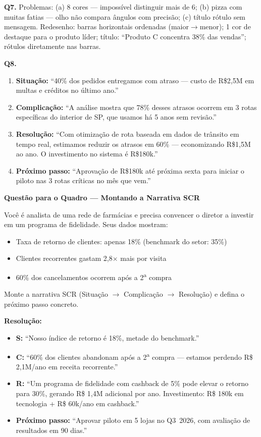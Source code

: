 \begin{SolvedBox}
\textbf{Q7.} Problemas: (a) 8 cores — impossível distinguir mais de 6; (b) pizza com muitas fatias —
olho não compara ângulos com precisão; (c) título rótulo sem mensagem. Redesenho:
barras horizontais ordenadas (maior$\to$menor); 1 cor de destaque para o produto líder;
título: ``Produto C concentra 38\% das vendas''; rótulos diretamente nas barras.

\textbf{Q8.}
\begin{enumerate}
  \item \textbf{Situação:} ``40\% dos pedidos entregamos com atraso — custo de R\$2,5M em multas e créditos no último ano.''
  \item \textbf{Complicação:} ``A análise mostra que 78\% desses atrasos ocorrem em 3 rotas específicas do interior de SP, que usamos há 5 anos sem revisão.''
  \item \textbf{Resolução:} ``Com otimização de rota baseada em dados de trânsito em tempo real, estimamos reduzir os atrasos em 60\% — economizando R\$1,5M ao ano. O investimento no sistema é R\$180k.''
  \item \textbf{Próximo passo:} ``Aprovação de R\$180k até próxima sexta para iniciar o piloto nas 3 rotas críticas no mês que vem.''
\end{enumerate}
\end{SolvedBox}

\begin{SolvedBox}
\textbf{Questão para o Quadro — Montando a Narrativa SCR}

Você é analista de uma rede de farmácias e precisa convencer o
diretor a investir em um programa de fidelidade. Seus dados mostram:
\begin{itemize}
  \item Taxa de retorno de clientes: apenas 18\% (benchmark do setor: 35\%)
  \item Clientes recorrentes gastam 2{,}8$\times$ mais por visita
  \item 60\% dos cancelamentos ocorrem após a 2\textsuperscript{a} compra
\end{itemize}

Monte a narrativa SCR (Situação $\to$ Complicação $\to$ Resolução)
e defina o próximo passo concreto.

\textbf{Resolução:}
\begin{itemize}
  \item \textbf{S:} ``Nosso índice de retorno é 18\%, metade do benchmark.''
  \item \textbf{C:} ``60\% dos clientes abandonam após a 2\textsuperscript{a}
  compra — estamos perdendo R\$ 2,1M/ano em receita recorrente.''
  \item \textbf{R:} ``Um programa de fidelidade com cashback de 5\% pode
  elevar o retorno para 30\%, gerando R\$ 1,4M adicional por ano.
  Investimento: R\$ 180k em tecnologia + R\$ 60k/ano em cashback.''
  \item \textbf{Próximo passo:} ``Aprovar piloto em 5 lojas no Q3~2026,
  com avaliação de resultados em 90 dias.''
\end{itemize}
\end{SolvedBox}

